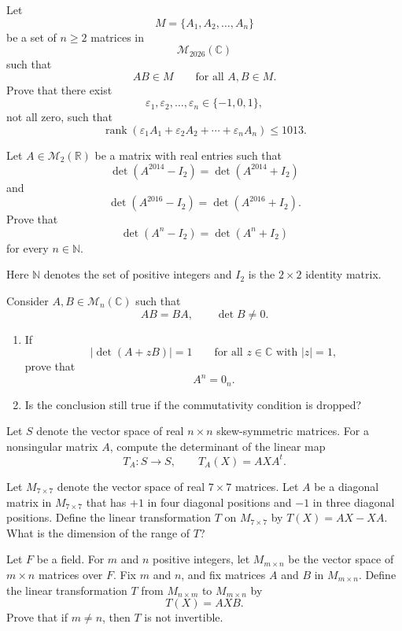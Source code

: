 \documentclass[12pt]{article}
\DeclareMathOperator{\rank}{rank}
\begin{document}
\begin{problem}
Let
\[
M=\{A_1,A_2,\ldots,A_n\}
\]
be a set of \(n\ge2\) matrices in
\[
\mathcal M_{2026}(\mathbb C)
\]
such that
\[
AB\in M\qquad\text{for all }A,B\in M.
\]
Prove that there exist
\[
\varepsilon_1,\varepsilon_2,\ldots,\varepsilon_n\in\{-1,0,1\},
\]
not all zero, such that
\[
\rank\left(\varepsilon_1A_1+\varepsilon_2A_2+\cdots+\varepsilon_nA_n\right)
\le1013.
\]
\end{problem}

\begin{problem}
Let \(A\in\mathcal M_2(\mathbb R)\) be a matrix with real entries such that
\[
\det(A^{2014}-I_2)=\det(A^{2014}+I_2)
\]
and
\[
\det(A^{2016}-I_2)=\det(A^{2016}+I_2).
\]
Prove that
\[
\det(A^n-I_2)=\det(A^n+I_2)
\]
for every \(n\in\mathbb N\).

Here \(\mathbb N\) denotes the set of positive integers and \(I_2\) is the \(2\times2\) identity matrix.
\end{problem}

\begin{problem}
Consider \(A,B\in\mathcal M_n(\mathbb C)\) such that
\[
AB=BA,\qquad \det B\ne0.
\]
\begin{enumerate}[label=\textup{(\alph*)}, leftmargin=2em]
    \item If
    \[
    |\det(A+zB)|=1
    \qquad\text{for all }z\in\mathbb C\text{ with }|z|=1,
    \]
    prove that
    \[
    A^n=0_n.
    \]
    \item Is the conclusion still true if the commutativity condition is dropped?
\end{enumerate}
\end{problem}

\begin{problem}
Let $S$ denote the vector space of real $n\times n$ skew-symmetric matrices. For a nonsingular matrix $A$, compute the determinant of the linear map
\[
T_A : S \to S, \qquad T_A(X) = AXA^t.
\]
\end{problem}

\begin{problem}
Let $M_{7\times 7}$ denote the vector space of real $7\times 7$ matrices. Let $A$ be a diagonal matrix in $M_{7\times 7}$ that has $+1$ in four diagonal positions and $-1$ in three diagonal positions. Define the linear transformation $T$ on $M_{7\times 7}$ by $T(X) = AX - XA$. What is the dimension of the range of $T$?
\end{problem}

\begin{problem}
Let $F$ be a field. For $m$ and $n$ positive integers, let $M_{m\times n}$ be the vector space of $m\times n$ matrices over $F$. Fix $m$ and $n$, and fix matrices $A$ and $B$ in $M_{m\times n}$. Define the linear transformation $T$ from $M_{n\times m}$ to $M_{m\times n}$ by
\[
T(X) = AXB.
\]
Prove that if $m \neq n$, then $T$ is not invertible.
\end{problem}
\end{document}
